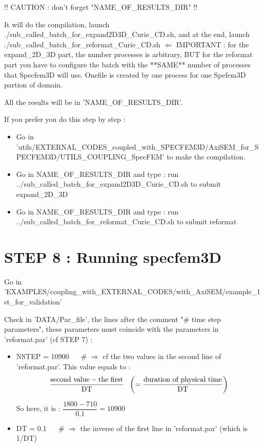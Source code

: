 \documentclass[11pt]{article}
\newcommand{\ds}{\displaystyle}
\begin{document}
\noindent !! CAUTION : don't forget "NAME\_OF\_RESULTS\_DIR" !!

\medskip

\noindent It will do the compilation, launch ./sub\_called\_batch\_for\_expand2D3D\_Curie\_CD.sh, and at the end, launch ./sub\_called\_batch\_for\_reformat\_Curie\_CD.sh $\Longleftarrow$ IMPORTANT : for the expand\_2D\_3D part, the number processes is arbitrary, BUT for the reformat part you have to configure the batch with the **SAME** number of processes that Specfem3D will use. Onefile is created by one process for one Spefem3D partion of domain.

\smallskip

\noindent All the results will be in 'NAME\_OF\_RESULTS\_DIR'.

\bigskip

\noindent If you prefer you do this step by step :

\begin{itemize}

\item[\textbullet] Go in {\scriptsize 'utils/EXTERNAL\_CODES\_coupled\_with\_SPECFEM3D/AxiSEM\_for\_SPECFEM3D/UTILS\_COUPLING\_SpecFEM'} to make the compilation.
\item[\textbullet] Go in NAME\_OF\_RESULTS\_DIR and type : run ../sub\_called\_batch\_for\_expand2D3D\_Curie\_CD.sh to submit expand\_2D\_3D
\item[\textbullet] Go in NAME\_OF\_RESULTS\_DIR and type : run ../sub\_called\_batch\_for\_reformat\_Curie\_CD.sh to submit reformat

\end{itemize}

\section{STEP 8 : Running specfem3D}

\noindent Go in 'EXAMPLES/coupling\_with\_EXTERNAL\_CODES/with\_AxiSEM/example\_1st\_for\_validation'

\medskip

\noindent Check in 'DATA/Par\_file', the lines after the comment "\# time step parameters", these parameters must coincide with the parameters in  'reformat.par' (cf STEP 7) :

\begin{itemize}

\item[\textbullet] NSTEP = 10900 ~~ \# $\Longrightarrow$ cf the two values in the second line of 'reformat.par'. This value equals to :
$$\ds \dfrac{\hbox{second value} - \hbox{the first}}{\text{DT}} ~~ \left(= \dfrac{\hbox{duration of physical time}}{\text{DT}} \right)$$

\noindent So here, it is : $\ds \dfrac{1800 - 710}{0.1} = 10900$

\medskip

\item[\textbullet] DT = 0.1 ~~ \# $\Longrightarrow$ the inverse of the first line in 'reformat.par' (which is 1/DT)

\end{itemize}
\end{document}
